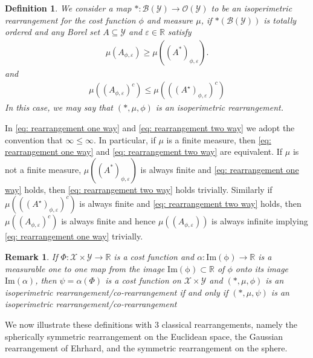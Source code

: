 \documentclass[11pt]{article}
\newtheorem{remark}[conjecture]{Remark}
\newtheorem{definition}[conjecture]{Definition}
\newcommand{\1}{[1]}
\begin{document}
\begin{definition}
    \label{def:isoperimetric-rearrangement}
    We consider a map  $*: \mathcal{B}(\mathcal{Y}) \to \mathcal{O}(\mathcal{Y})$ to be an \emph{isoperimetric rearrangement} for the cost function $\phi$ and measure $\mu$, if $* (\mathcal{B}(\mathcal{Y}))$ is totally ordered and any Borel set $A \subseteq \mathcal{Y}$ and $\varepsilon \in \mathbb{R}$ satisfy
    \begin{align} \label{eq: rearrangement one way}
        \mu(A_{\phi,\varepsilon}) \geq \mu((A^*)_{\phi,\varepsilon}).
    \end{align}
    and
    \begin{align} \label{eq: rearrangement two way}
        \mu((A_{\phi,\varepsilon})^c) \leq \mu(((A^\star)_{\phi,\varepsilon})^c) 
    \end{align}
    In this case, we may say that $(*,\mu,\phi)$ is an isoperimetric rearrangement.
\end{definition}

In \eqref{eq: rearrangement one way} and \eqref{eq: rearrangement two way} we adopt the convention that 
$\infty \leq \infty$. 
In particular, if $\mu$ is a finite measure, then \eqref{eq: rearrangement one way} and \eqref{eq: rearrangement two way} are equivalent.  If $\mu$ is  not a finite measure, $\mu((A^*)_{\phi,\varepsilon})$ is always finite and \eqref{eq: rearrangement one way} holds, then \eqref{eq: rearrangement two way} holds trivially.  Similarly if $\mu(((A^\star)_{\phi,\varepsilon})^c) $ is always finite and \eqref{eq: rearrangement two way} holds, then $\mu((A_{\phi,\varepsilon})^c)$ is always finite and hence $\mu((A_{\phi,\varepsilon}))$ is always infinite implying \eqref{eq: rearrangement one way} trivially. 





\begin{remark} \label{rem:transfer}
If $\Phi \colon \mathcal{X} \times \mathcal{Y} \to \mathbb{R}$ is a cost function and $\alpha \colon \mathrm{Im(\phi)} \to \mathbb{R}$ is a measurable one to one map from the image $\mathrm{Im(\phi)} \subset \mathbb{R}$ of $\phi$ onto its image $\mathrm{Im}(\alpha)$, then $\psi = \alpha(\Phi)$  is a cost function on $\mathcal{X} \times \mathcal{Y}$ and $(*,\mu,\phi)$
is an isoperimetric rearrangement/co-rearrangement if and only if 
$(*,\mu,\psi)$
is an isoperimetric rearrangement/co-rearrangement 
\end{remark}


We now illustrate  these definitions 
with 3 classical rearrangements, namely the spherically symmetric rearrangement on the Euclidean space, the Gaussian rearrangement of Ehrhard, and the symmetric rearrangement on the sphere.
\end{document}
